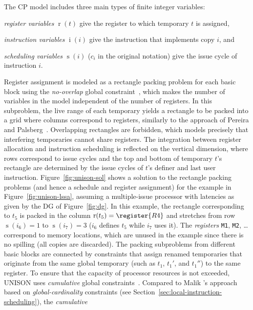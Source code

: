 \documentclass[acmsmall,authorversion,nonacm]{acmart}
\newcommand{\noMathVar}[2]{\operatorname{#1}(#2)}
\newcommand{\var}[2]{$\noMathVar{#1}{#2}$}
\begin{document}
The CP model includes three main types of finite integer variables:
\begin{inparaitem}[]
\item \emph{register variables} \var{r}{t} give the register to
  which temporary $t$ is assigned,
\item \emph{instruction variables} \var{i}{i} give the instruction
  that implements copy $i$, and
\item \emph{scheduling variables} \var{s}{i} ($c_i$ in the original
  notation) give the issue cycle of instruction $i$.
\end{inparaitem}
Register assignment is modeled as a rectangle packing problem for each
basic block using the \emph{no-overlap} global
constraint~\cite{Beldiceanu2001}, which makes the number of variables
in the model independent of the number of registers.
In this subproblem, the live range of each temporary yields a
rectangle to be packed into a grid where columns correspond to
registers, similarly to the approach of Pereira and
Palsberg~\cite{Pereira2008}.
Overlapping rectangles are forbidden, which models precisely that
interfering temporaries cannot share registers.
The integration between register allocation and instruction scheduling
is reflected on the vertical dimension, where rows correspond to issue
cycles and the top and bottom of temporary $t$'s rectangle are
determined by the issue cycles of $t$'s definer and last user
instruction.
Figure~\ref{fig:unison-sol} shows a solution to the rectangle packing
problems (and hence a schedule and register assignment) for the
example in Figure~\ref{fig:unison-lssa}, assuming a multiple-issue
processor with latencies as given by the DG of Figure~\ref{fig:dg}.
In this example, the rectangle corresponding to $t_5$ is packed in the
column $\noMathVar{r}{t_5} = \register{R4}$ and stretches from row
$\noMathVar{s}{i_6} = 1$ to $\noMathVar{s}{i_7} = 3$ ($i_6$ defines
$t_5$ while $i_7$ uses it).
The \emph{registers} \texttt{M1}, \texttt{M2}, \dots correspond to
memory locations, which are unused in the example since there is no
spilling (all copies are discarded).
The packing subproblems from different basic blocks are connected by
constraints that assign renamed temporaries that originate from the
same global temporary (such as $t_1$, $t_1'$, and $t_1''$) to the same
register.
To ensure that the capacity of processor resources is not exceeded,
UNISON uses \emph{cumulative} global constraints~\cite{CPH:global}.
Compared to Malik \etal{}'s approach based on
\emph{global-cardinality} constraints (see
Section~\ref{sec:local-instruction-scheduling}), the \emph{cumulative}
\end{document}
